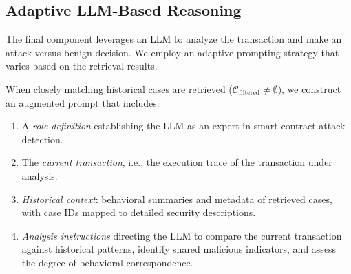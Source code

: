 \subsection{Adaptive LLM-Based Reasoning}
\label{sec:reasoning}

The final component leverages an LLM to analyze the transaction and make an attack-versus-benign decision. We employ an adaptive prompting strategy that varies based on the retrieval results.


When closely matching historical cases are retrieved ($\mathcal{C}_{\text{filtered}} \neq \emptyset$), we construct an augmented prompt that includes:

\begin{enumerate}
    \item A \textit{role definition} establishing the LLM as an expert in smart contract attack detection.
    \item The \textit{current transaction}, i.e., the execution trace of the transaction under analysis.
    \item \textit{Historical context}: behavioral summaries and metadata of retrieved cases, with case IDs mapped to detailed security descriptions.
    \item \textit{Analysis instructions} directing the LLM to compare the current transaction against historical patterns, identify shared malicious indicators, and assess the degree of behavioral correspondence.
\end{enumerate}


